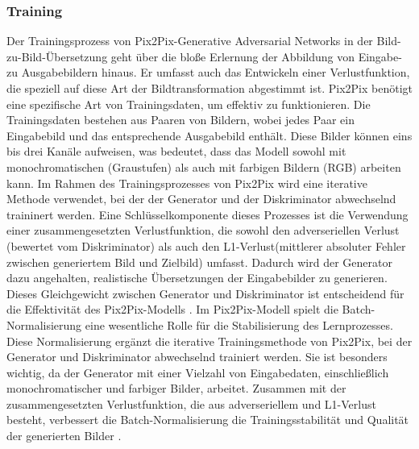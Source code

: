 \subsubsection{Training}

Der Trainingsprozess von Pix2Pix-Generative Adversarial Networks in der Bild-zu-Bild-Übersetzung geht über die bloße Erlernung der Abbildung von Eingabe- zu Ausgabebildern hinaus. Er umfasst auch das Entwickeln einer Verlustfunktion, die speziell auf diese Art der Bildtransformation abgestimmt ist. Pix2Pix benötigt eine spezifische Art von Trainingsdaten, um effektiv zu funktionieren. Die Trainingsdaten bestehen aus Paaren von Bildern, wobei jedes Paar ein Eingabebild und das entsprechende Ausgabebild enthält. Diese Bilder können eins bis drei Kanäle aufweisen, was bedeutet, dass das Modell sowohl mit monochromatischen (Graustufen) als auch mit farbigen Bildern (RGB) arbeiten kann.
Im Rahmen des Trainingsprozesses von Pix2Pix wird eine iterative Methode verwendet, bei der der Generator und der Diskriminator abwechselnd traininert werden.
Eine Schlüsselkomponente dieses Prozesses ist die Verwendung einer zusammengesetzten Verlustfunktion, die sowohl den adverseriellen Verlust (bewertet vom Diskriminator) als auch den L1-Verlust(mittlerer absoluter Fehler zwischen generiertem Bild und Zielbild) umfasst. Dadurch wird der Generator dazu angehalten, realistische Übersetzungen der Eingabebilder zu generieren. Dieses Gleichgewicht zwischen Generator und Diskriminator ist entscheidend für die Effektivität des Pix2Pix-Modells \cite{HazemAbdelmotaalAhmedA.AbdouAhmedF.OmarDaliaMohamedElSebaityKhaledAbdelazeem.2021}.\newline
Im Pix2Pix-Modell spielt die Batch-Normalisierung eine wesentliche Rolle für die Stabilisierung des Lernprozesses.
Diese Normalisierung ergänzt die iterative Trainingsmethode von Pix2Pix, bei der Generator und Diskriminator abwechselnd trainiert werden. Sie ist besonders wichtig, da der Generator mit einer Vielzahl von Eingabedaten, einschließlich monochromatischer und farbiger Bilder, arbeitet. Zusammen mit der zusammengesetzten Verlustfunktion, die aus adverseriellem und L1-Verlust besteht, verbessert die Batch-Normalisierung die Trainingsstabilität und Qualität der generierten Bilder \cite{PhillipIsola.}. 
  


